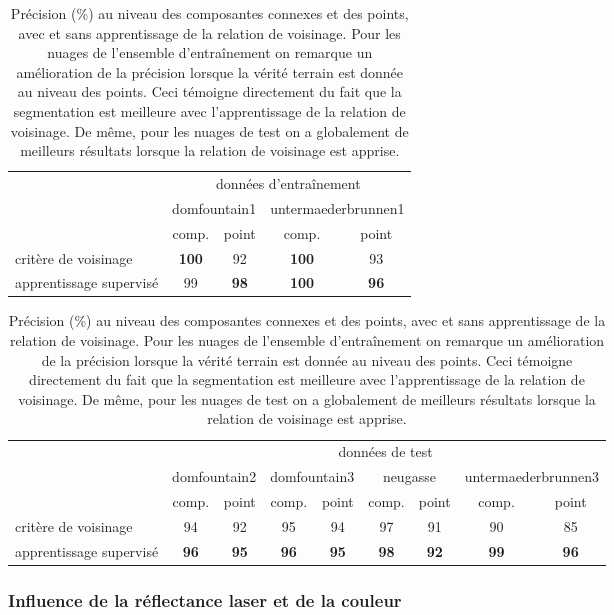 \documentclass[a4paper, onecolumn, 11pt]{article}
\begin{document}
\begin{table}[p]

\caption{Précision (\%) au niveau des composantes connexes et des points, avec et sans apprentissage de la relation de voisinage. Pour les nuages de l'ensemble d'entraînement on remarque un amélioration de la précision lorsque la vérité terrain est donnée au niveau des points. Ceci témoigne directement du fait que la segmentation est meilleure avec l'apprentissage de la relation de voisinage. De même, pour les nuages de test on a globalement de meilleurs résultats lorsque la relation de voisinage est apprise.}


\begin{tabular}{l|c|c|c|c|}
\cline{2-5} & \multicolumn{4}{c|}{données d'entraînement} \\
\cline{2-5} & \multicolumn{2}{c|}{domfountain1} & \multicolumn{2}{c|}{untermaederbrunnen1} \\
\cline{2-5} & comp. & point & comp. & point \\
\hline
\multicolumn{1}{|l|}{critère de voisinage} & \textbf{100} & 92 & \textbf{100} & 93 \\
\hline
\multicolumn{1}{|l|}{apprentissage supervisé} & 99 & \textbf{98} & \textbf{100} & \textbf{96}\\
\hline
\end{tabular}

\bigskip

\begin{tabular}{l|c|c|c|c|c|c|c|c|}
\cline{2-9}
& \multicolumn{8}{|c|}{données de test}\\
\cline{2-9}
& \multicolumn{2}{|c|}{domfountain2} & \multicolumn{2}{c|}{domfountain3} & \multicolumn{2}{c|}{neugasse} & \multicolumn{2}{c|}{untermaederbrunnen3}\\
\cline{2-9}
& comp. & point & comp. & point & comp. & point & comp. & point \\
\hline
\multicolumn{1}{|l|}{critère de voisinage} & 94 & 92 & 95 & 94 & 97 & 91 & 90 & 85\\
\hline
\multicolumn{1}{|l|}{apprentissage supervisé} & \textbf{96} & \textbf{95} & \textbf{96} & \textbf{95} & \textbf{98} & \textbf{92} & \textbf{99} & \textbf{96}\\
\hline


\end{tabular}
\label{table:neighbourhood}
\end{table}

\subsubsection{Influence de la réflectance laser et de la couleur}
\end{document}
